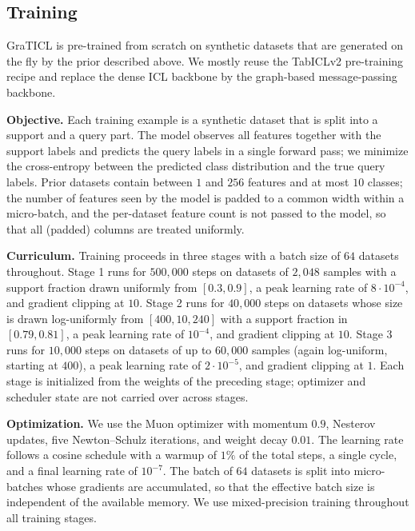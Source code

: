 \documentclass{article} %
\begin{document}
\subsection{Training}

GraTICL is pre-trained from scratch on synthetic datasets that are generated on the fly by the prior described above. We mostly reuse the TabICLv2 pre-training recipe and replace the dense ICL backbone by the graph-based message-passing backbone.

\textbf{Objective.} Each training example is a synthetic dataset that is split into a support and a query part. The model observes all features together with the support labels and predicts the query labels in a single forward pass; we minimize the cross-entropy between the predicted class distribution and the true query labels. Prior datasets contain between $1$ and $256$ features and at most $10$ classes; the number of features seen by the model is padded to a common width within a micro-batch, and the per-dataset feature count is not passed to the model, so that all (padded) columns are treated uniformly.

\textbf{Curriculum.} Training proceeds in three stages with a batch size of $64$ datasets throughout. Stage 1 runs for $500{,}000$ steps on datasets of $2{,}048$ samples with a support fraction drawn uniformly from $[0.3, 0.9]$, a peak learning rate of $8 \cdot 10^{-4}$, and gradient clipping at $10$. Stage 2 runs for $40{,}000$ steps on datasets whose size is drawn log-uniformly from $[400, 10{,}240]$ with a support fraction in $[0.79, 0.81]$, a peak learning rate of $10^{-4}$, and gradient clipping at $10$. Stage 3 runs for $10{,}000$ steps on datasets of up to $60{,}000$ samples (again log-uniform, starting at $400$), a peak learning rate of $2 \cdot 10^{-5}$, and gradient clipping at $1$. Each stage is initialized from the weights of the preceding stage; optimizer and scheduler state are not carried over across stages.

\textbf{Optimization.} We use the Muon optimizer with momentum $0.9$, Nesterov updates, five Newton--Schulz iterations, and weight decay $0.01$. The learning rate follows a cosine schedule with a warmup of $1\%$ of the total steps, a single cycle, and a final learning rate of $10^{-7}$. The batch of $64$ datasets is split into micro-batches whose gradients are accumulated, so that the effective batch size is independent of the available memory. We use mixed-precision training throughout all training stages.
\end{document}
